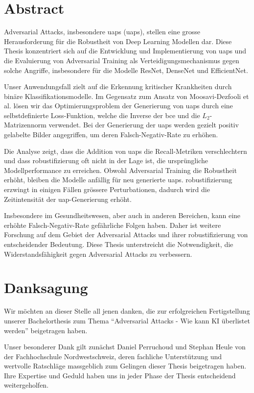 \section*{Abstract} 
Adversarial Attacks, insbesondere \acrlong{uap}s (\acrshort{uap}s), stellen eine grosse Herausforderung für die Robustheit von Deep Learning Modellen dar. Diese Thesis konzentriert sich auf die Entwicklung und Implementierung von \acrshort{uap}s und die Evaluierung von Adversarial Training als Verteidigungsmechanismus gegen solche Angriffe, insbesondere für die Modelle ResNet, DenseNet und EfficientNet.

Unser Anwendungsfall zielt auf die Erkennung kritischer Krankheiten durch binäre Klassifikationsmodelle. Im Gegensatz zum Ansatz von Moosavi-Dezfooli et al. \cite{moosavi-dezfooli_universal_2017} lösen wir das Optimierungsproblem der Generierung von \acrshort{uap}s durch eine selbstdefinierte Loss-Funktion, welche die Inverse der \acrlong{bce} und die $L_2$-Matrizennorm verwendet. Bei der Generierung der \acrshort{uap}s werden gezielt positiv gelabelte Bilder angegriffen, um deren Falsch-Negativ-Rate zu erhöhen.

Die Analyse zeigt, dass die Addition von \acrshort{uap}s die Recall-Metriken verschlechtern und dass \Gls{robustifizierung} oft nicht in der Lage ist, die ursprüngliche Modellperformance zu erreichen. Obwohl Adversarial Training die Robustheit erhöht, bleiben die Modelle anfällig für neu generierte \acrshort{uap}s. \Gls{robustifizierung} erzwingt in einigen Fällen grössere Perturbationen, dadurch wird die Zeitintensität der \acrshort{uap}-Generierung erhöht.

Insbesondere im Gesundheitswesen, aber auch in anderen Bereichen, kann eine erhöhte Falsch-Negativ-Rate gefährliche Folgen haben. Daher ist weitere Forschung auf dem Gebiet der Adversarial Attacks und ihrer \Gls{robustifizierung} von entscheidender Bedeutung. Diese Thesis unterstreicht die Notwendigkeit, die Widerstandsfähigkeit gegen Adversarial Attacks zu verbessern.

\clearpage

\section*{Danksagung}
Wir möchten an dieser Stelle all jenen danken, die zur erfolgreichen Fertigstellung unserer Bachelorthesis zum Thema ``Adversarial Attacks - Wie kann KI überlistet werden'' beigetragen haben.

Unser besonderer Dank gilt zunächst Daniel Perruchoud und Stephan Heule von der Fachhochschule Nordwestschweiz, deren fachliche Unterstützung und wertvolle Ratschläge massgeblich zum Gelingen dieser Thesis beigetragen haben. Ihre Expertise und Geduld haben uns in jeder Phase der Thesis entscheidend weitergeholfen.

